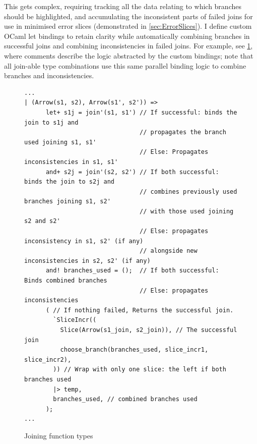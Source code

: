 This gets complex, requiring tracking all the data relating to which branches should be highlighted, and accumulating the inconsistent parts of failed joins for use in minimised error slices (demonstrated in \cref{sec:ErrorSlices}). I define custom OCaml let bindings \cite{CustomLetOperators} to retain clarity while automatically combining branches in successful joins and combining inconsistencies in failed joins. For example, see \cref{fig:ArrowJoin}, where comments describe the logic abstracted by the custom bindings; note that all join-able type combinations use this same parallel binding logic to combine branches and inconsistencies.

\begin{figure}[h]
\small
\begin{verbatim}
...
| (Arrow(s1, s2), Arrow(s1', s2')) =>
      let+ s1j = join'(s1, s1') // If successful: binds the join to s1j and
                                // propagates the branch used joining s1, s1'
                                // Else: Propagates inconsistencies in s1, s1'
      and+ s2j = join'(s2, s2') // If both successful: binds the join to s2j and
                                // combines previously used branches joining s1, s2' 
                                // with those used joining s2 and s2'
                                // Else: propagates inconsistency in s1, s2' (if any)
                                // alongside new inconsistencies in s2, s2' (if any)
      and! branches_used = ();  // If both successful: Binds combined branches
                                // Else: propagates inconsistencies
      ( // If nothing failed, Returns the successful join.
        `SliceIncr((
          Slice(Arrow(s1_join, s2_join)), // The successful join
          choose_branch(branches_used, slice_incr1, slice_incr2),
        )) // Wrap with only one slice: the left if both branches used
        |> temp,
        branches_used, // combined branches used
      );
...
\end{verbatim}
\caption{Joining function types}
\label{fig:ArrowJoin}
\end{figure}

